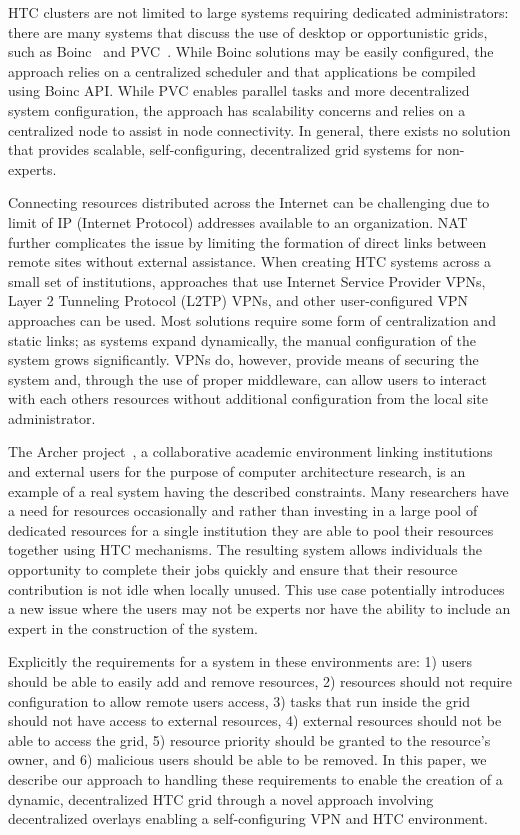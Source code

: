 \documentclass{sig-alternate}
\begin{document}
HTC clusters are not limited to large systems requiring dedicated
administrators: there are many systems that discuss the use of desktop or
opportunistic grids, such as Boinc~\cite{boinc} and PVC~\cite{pvc}.  While Boinc
solutions may be easily configured, the approach relies on a centralized
scheduler and that applications be compiled using Boinc API.  While PVC
enables parallel tasks and more decentralized system configuration, the
approach has scalability concerns and relies on a centralized node to assist in
node connectivity.  In general, there exists no solution that provides
scalable, self-configuring, decentralized grid systems for non-experts.

Connecting resources distributed across the Internet can be challenging due to
limit of IP (Internet Protocol) addresses available to an organization.  NAT
further complicates the issue by limiting the formation of direct links between
remote sites without external assistance.  When creating HTC systems across a
small set of institutions, approaches that use Internet Service Provider VPNs,
Layer 2 Tunneling Protocol (L2TP) VPNs, and other user-configured VPN
approaches can be used.  Most solutions require some form of centralization
and static links; as systems expand dynamically, the manual configuration of
the system grows significantly.  VPNs do, however, provide means of securing
the system and, through the use of proper middleware, can allow users to
interact with each others resources without additional configuration from the
local site administrator.

The Archer project~\cite{archer}, a collaborative academic environment
linking institutions and external users for the purpose of computer architecture
research, is an example of a real system having the described constraints.  Many
researchers have a need for resources occasionally and rather than investing
in a large pool of dedicated resources for a single institution they are able
to pool their resources together using HTC mechanisms.  The resulting system
allows individuals the opportunity to complete their jobs quickly and ensure
that their resource contribution is not idle when locally unused.  This use
case potentially introduces a new issue where the users may not be experts nor
have the ability to include an expert in the construction of the system.

Explicitly the requirements for a system in these environments are: 1) users
should be able to easily add and remove resources, 2) resources should not
require configuration to allow remote users access, 3) tasks that run inside
the grid should not have access to external resources, 4) external resources
should not be able to access the grid, 5) resource priority should be granted
to the resource's owner, and 6) malicious users should be able to be removed.
In this paper, we describe our approach to handling these requirements to
enable the creation of a dynamic, decentralized HTC grid through a novel
approach involving decentralized overlays enabling a self-configuring VPN
and HTC environment.  
\end{document}
